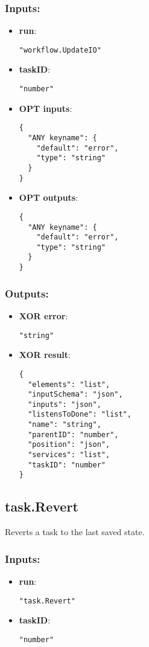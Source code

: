 \subsubsection*{Inputs:}
\begin{itemize}
    \item \textbf{run}: 
\begin{lstlisting}
"workflow.UpdateIO"
\end{lstlisting}
    \item \textbf{taskID}: 
\begin{lstlisting}
"number"
\end{lstlisting}
    \item \textbf{OPT inputs}: 
\begin{lstlisting}
{
  "ANY keyname": {
    "default": "error", 
    "type": "string"
  }
}
\end{lstlisting}
    \item \textbf{OPT outputs}: 
\begin{lstlisting}
{
  "ANY keyname": {
    "default": "error", 
    "type": "string"
  }
}
\end{lstlisting}
  \end{itemize}

\subsubsection*{Outputs:}
\begin{itemize}
    \item \textbf{XOR error}: 
\begin{lstlisting}
"string"
\end{lstlisting}
    \item \textbf{XOR result}: 
\begin{lstlisting}
{
  "elements": "list", 
  "inputSchema": "json", 
  "inputs": "json", 
  "listensToDone": "list", 
  "name": "string", 
  "parentID": "number", 
  "position": "json", 
  "services": "list", 
  "taskID": "number"
}
\end{lstlisting}
  \end{itemize}

\subsection{task.Revert}
Reverts a task to the last saved state.
\subsubsection*{Inputs:}
\begin{itemize}
    \item \textbf{run}: 
\begin{lstlisting}
"task.Revert"
\end{lstlisting}
    \item \textbf{taskID}: 
\begin{lstlisting}
"number"
\end{lstlisting}
  \end{itemize}

